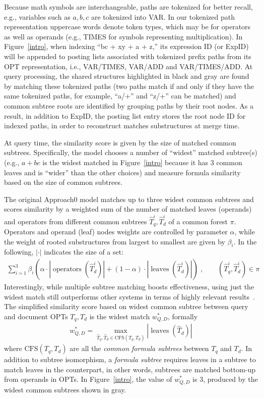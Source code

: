 \documentclass[runningheads]{llncs}
\begin{document}
Because math symbols are interchangeable, paths are tokenized for better recall, e.g., variables such as $a, b, c$ are tokenized into VAR. In our tokenized path representation uppercase words denote token types, which may be for operators as well as operands (e.g., TIMES for symbols representing multiplication).
In Figure~\ref{intro}, when indexing ``bc + xy + a + z,'' its expression ID (or ExpID) will be appended to posting lists associated with tokenized prefix paths from its OPT representation, i.e.,  VAR/TIMES, VAR/ADD and VAR/TIMES/ADD.
At query processing, the shared structures highlighted in black and gray are found by matching these tokenized paths (two paths match if and only if they have the same tokenized paths, for example, ``a/+'' and ``z/+'' can be matched) and common subtree roots  are identified by grouping paths by their root nodes.
%
As a result, in addition to ExpID, the posting list entry stores the root node ID for indexed paths, in order to reconstruct matches substructures at merge time.

At query time, the similarity score is given by the size of matched common subtrees.
%
Specifically, the model chooses a number of ``widest'' matched subtree(s) (e.g., $a+bc$ is the widest matched in Figure~\ref{intro} because it has 3 common leaves and is ``wider'' than the other choices) and measure formula similarity based on the size of common subtrees.

The original Approach0 model \cite{a0_2019} matches up to three widest common subtrees and scores similarity by a weighted sum of the number of matched leaves (operands) and operators from different common subtrees $\hat{T}_q^i, \hat{T}_d^i$ of a common forest $\pi$. Operators and operand (leaf) nodes weights are controlled by parameter $\alpha$, while the weight of rooted substructures from largest to smallest are given by $\beta_i$. In the following, $|\cdot|$ indicates the size of a set:
\begin{align}
\label{eq:1}
\sum^3_{i=1} \beta_i \left( \alpha \cdot \left|\operatorname{operators}(\hat{T}_d^i)\right| + (1 - \alpha) \cdot \left|\operatorname{leaves}(\hat{T}_d^i)\right| \right)\;, \qquad (\hat{T}_q^i, \hat{T}_d^i) \in \pi
\end{align}
%
Interestingly, while multiple subtree matching boosts effectiveness, using just the widest match still outperforms other systems in terms of highly relevant results~\cite{a0_2019}.
%
The simplified similarity score based on widest common subtree between query and document OPTs $T_q, T_d$ is the widest match $w^*_{Q, D}$, formally
\begin{align}
\label{eq:2}
w^*_{Q, D} = \max_{\hat{T}_q, \hat{T}_d \in \text{CFS}(T_q,T_d)} |\operatorname{leaves}(\hat{T}_d)|
\end{align}
where
$\text{CFS}(T_q, T_d)$ are all the \textit{common formula subtrees} between $T_q$ and $T_d$.
In addition to subtree isomorphism, a \emph{formula subtree} requires leaves in a subtree to match leaves in the counterpart, in other words, subtrees are matched bottom-up from operands in OPTs.
%
In Figure~\ref{intro}, the value of $w^*_{Q, D}$ is 3, produced by the widest common subtrees shown in gray.
\end{document}
